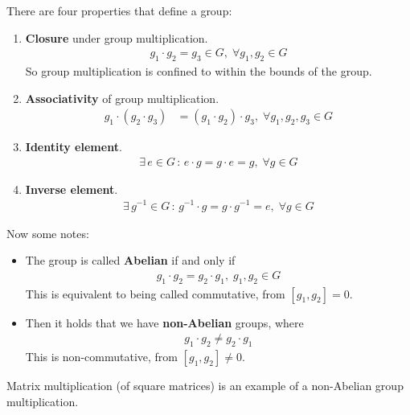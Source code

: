 \documentclass[a4paper, 11pt, normalem]{report}
\begin{document}
There are four properties that define a group:
\begin{enumerate}
    \item \textbf{Closure} under group multiplication.
        \begin{align}
            g_1\cdot g_2 = g_3 \in G,\; \forall g_1,g_2 \in G
        \end{align}
        So group multiplication is confined to within the bounds of the group.
    \item \textbf{Associativity} of group multiplication.
        \begin{align}
            g_1\cdot(g_2\cdot g_3) &= (g_1\cdot g_2)\cdot g_3,\; \forall g_1,g_2,g_3 \in G
        \end{align}
    \item \textbf{Identity element}.
        \begin{align}
            \exists\, e \in G\,:\, e\cdot g = g\cdot e = g,\; \forall g \in G
        \end{align}
    \item \textbf{Inverse element}.
        \begin{align}
             \exists\, g^{-1} \in G\,:\, g^{-1}\cdot g = g\cdot g^{-1} = e,\; \forall g \in G
        \end{align}
\end{enumerate}

Now some notes:
\begin{itemize}
    \item The group is called \textbf{Abelian} if and only if
        \begin{align}
            g_1\cdot g_2 = g_2\cdot g_1,\; g_1,g_2 \in G
        \end{align}
        This is equivalent to being called commutative, from $[g_1,g_2]=0$.
    \item Then it holds that we have \textbf{non-Abelian} groups, where
        \begin{align}
            g_1\cdot g_2 \neq g_2\cdot g_1
        \end{align}
        This is non-commutative, from $[g_1,g_2]\neq0$.
\end{itemize}
Matrix multiplication (of square matrices) is an example of a non-Abelian group multiplication.
\end{document}
